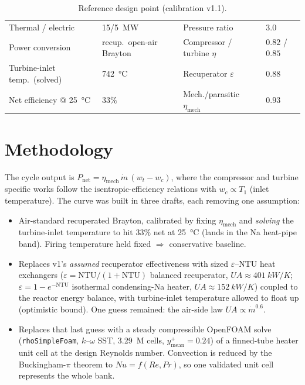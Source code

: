\documentclass[11pt]{article}
\begin{document}
\begin{table}[h]\centering\small
\caption{Reference design point (calibration v1.1).}\label{tab:ref}
\begin{tabular}{@{}llll@{}}
\toprule
Thermal / electric & \SI{15}{}/\SI{5}{\mega\watt} & Pressure ratio & $3.0$\\
Power conversion & recup.\ open-air Brayton & Compressor / turbine $\eta$ & $0.82$ / $0.85$\\
Turbine-inlet temp.\ (solved) & \SI{742}{\celsius} & Recuperator $\varepsilon$ & $0.88$\\
Net efficiency @ \SI{25}{\celsius} & $33\%$ & Mech./parasitic $\eta_{\mathrm{mech}}$ & $0.93$\\
\bottomrule
\end{tabular}
\end{table}

\section{Methodology}
The cycle output is $P_{\mathrm{net}}=\eta_{\mathrm{mech}}\,\dot m\,(w_t-w_c)$, where the compressor and turbine
specific works follow the isentropic-efficiency relations with $w_c\propto T_1$ (inlet temperature). The curve was
built in three drafts, each removing one assumption:

\begin{itemize}\itemsep1pt
\item[\textbf{v1}] Air-standard recuperated Brayton, calibrated by fixing $\eta_{\mathrm{mech}}$ and \emph{solving}
the turbine-inlet temperature to hit $33\%$ net at \SI{25}{\celsius} (lands in the Na heat-pipe band). Firing
temperature held fixed $\Rightarrow$ conservative baseline.
\item[\textbf{v1.5}] Replaces v1's \emph{assumed} recuperator effectiveness with sized $\varepsilon$--NTU heat
exchangers ($\varepsilon=\mathrm{NTU}/(1{+}\mathrm{NTU})$ balanced recuperator, $UA\approx\SI{401}{kW/K}$;
$\varepsilon=1-e^{-\mathrm{NTU}}$ isothermal condensing-Na heater, $UA\approx\SI{152}{kW/K}$) coupled to the
reactor energy balance, with turbine-inlet temperature allowed to float up (optimistic bound). One guess remained:
the air-side law $UA\propto\dot m^{0.6}$.
\item[\textbf{v2}] Replaces that last guess with a steady compressible OpenFOAM solve (\texttt{rhoSimpleFoam},
$k$--$\omega$ SST, \SI{3.29}{M} cells, $y^+_{\mathrm{mean}}=0.24$) of a finned-tube heater unit cell at the design
Reynolds number. Convection is reduced by the Buckingham-$\pi$ theorem to $Nu=f(Re,Pr)$, so one validated unit cell
represents the whole bank.
\end{itemize}
\end{document}
